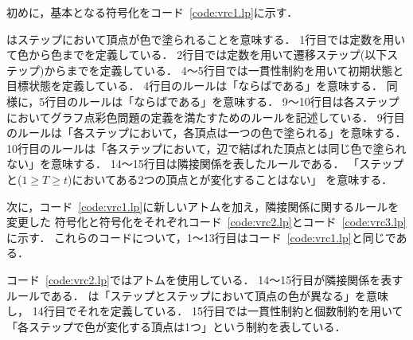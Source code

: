 初めに，基本となる符号化をコード~\ref{code:vrc1.lp}に示す．



はステップにおいて頂点が色で塗られることを意味する．
1行目では定数を用いて色から色までを定義している．
2行目では定数を用いて遷移ステップ(以下ステップ)からまでを定義している．
4～5行目では一貫性制約を用いて初期状態と目標状態を定義している．
4行目のルールは「ならばである」を意味する．
同様に，5行目のルールは「ならばである」を意味する．
9～10行目は各ステップにおいてグラフ点彩色問題の定義を満たすためのルールを記述している．
9行目のルールは「各ステップにおいて，各頂点は一つの色で塗られる」を意味する．
10行目のルールは「各ステップにおいて，辺で結ばれた頂点とは同じ色で塗られない」を意味する．
14～15行目は隣接関係を表したルールである．
「ステップと($1 \geq T \geq t$)においてある2つの頂点とが変化することはない」
を意味する．

次に，コード~\ref{code:vrc1.lp}に新しいアトムを加え，隣接関係に関するルールを変更した
符号化と符号化をそれぞれコード~\ref{code:vrc2.lp}とコード~\ref{code:vrc3.lp}に示す．
これらのコードについて，1～13行目はコード~\ref{code:vrc1.lp}と同じである．





コード~\ref{code:vrc2.lp}ではアトムを使用している．
14～15行目が隣接関係を表すルールである．
は「ステップとステップにおいて頂点の色が異なる」を意味し，
14行目でそれを定義している．
15行目では一貫性制約と個数制約を用いて「各ステップで色が変化する頂点は1つ」という制約を表している．

